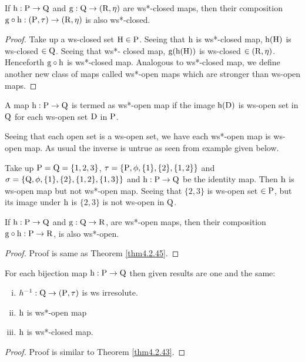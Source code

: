 \begin{thm}\label{thm4.2.45}
If $\mathrm{h}: \mathrm{P} \to \mathrm{Q}$ and $\mathrm{g}: \mathrm{Q}\to (\mathrm{R}, \eta)$ are ws*-closed maps, then their composition $\mathrm{g} \circ \mathrm{h}: (\mathrm{P}, \tau) \to (\mathrm{R}, \eta)$ is also ws*-closed.
\end{thm}

\begin{proof}
Take up a ws-closed set $\mathrm{H} \in \mathrm{P}$. Seeing that $\mathrm{h}$ is ws*-closed map, $\mathrm{h} (\mathrm{H})$ is ws-closed $\in \mathrm{Q}$. Seeing that ws*- closed map, $\mathrm{g} (\mathrm{h} (\mathrm{H}))$ is ws-closed $\in (\mathrm{R},\eta)$. Henceforth $\mathrm{g} \circ \mathrm{h}$ is ws*-closed map. Analogous to ws*-closed map, we define another new class of maps called ws*-open maps which are stronger than ws-open maps.
\end{proof}

\begin{dfn}\label{defi4.2.46}
A map $\mathrm{h}: \mathrm{P} \to \mathrm{Q}$ is termed as ws*-open map if the image $\mathrm{h} (\mathrm{D})$ is ws-open set in $\mathrm{Q}$ for each ws-open set $\mathrm{D}$ in $\mathrm{P}$.
\end{dfn}

\begin{rem}\label{rem4.2.47}
Seeing that each open set is a ws-open set, we have each ws*-open map is ws-open map. As usual the inverse is untrue as seen from example given below.
\end{rem}

\begin{exm}\label{exam4.2.48}
Take up $\mathrm{P} = \mathrm{Q} = \{1, 2, 3\}$, $\tau = \{\mathrm{P}, \phi, \{1\}, \{2\}, \{1, 2\}\}$ and $\sigma =\{\mathrm{Q}, \phi, \{1\}, \{2\}, \{1, 2\},\{1,3\}\}$ and $\mathrm{h}: \mathrm{P} \to \mathrm{Q}$ be the identity map. Then $\mathrm{h}$ is ws-open map but not ws*-open map. Seeing that $\{2, 3\}$ is ws-open set $\in\mathrm{P}$, but its image under $\mathrm{h}$ is $\{2, 3\}$ is not ws-open in $\mathrm{Q}$.
\end{exm}

\begin{thm}\label{4.2.49}
If $\mathrm{h}: \mathrm{P} \to \mathrm{Q}$ and $\mathrm{g}: \mathrm{Q} \to \mathrm{R}$, are ws*-open maps, then their composition $\mathrm{g} \circ \mathrm{h}: \mathrm{P} \to \mathrm{R}$, is also ws*-open.
\end{thm}

\begin{proof}
Proof is same as Theorem \ref{thm4.2.45}.
\end{proof}

\begin{thm}\label{thm4.2.50} 
For each bijection map $\mathrm{h}: \mathrm{P} \to \mathrm{Q}$ then given results are one and the same:
\begin{enumerate}[(i)]
\item $h^{-1}: \mathrm{Q}\to (\mathrm{P}, \tau)$ is ws irresolute.
\item $\mathrm{h}$ is ws*-open map
\item $\mathrm{h}$ is ws*-closed map.
\end{enumerate}
\end{thm}

\begin{proof}
Proof is similar to Theorem \ref{thm4.2.43}.
\end{proof}
